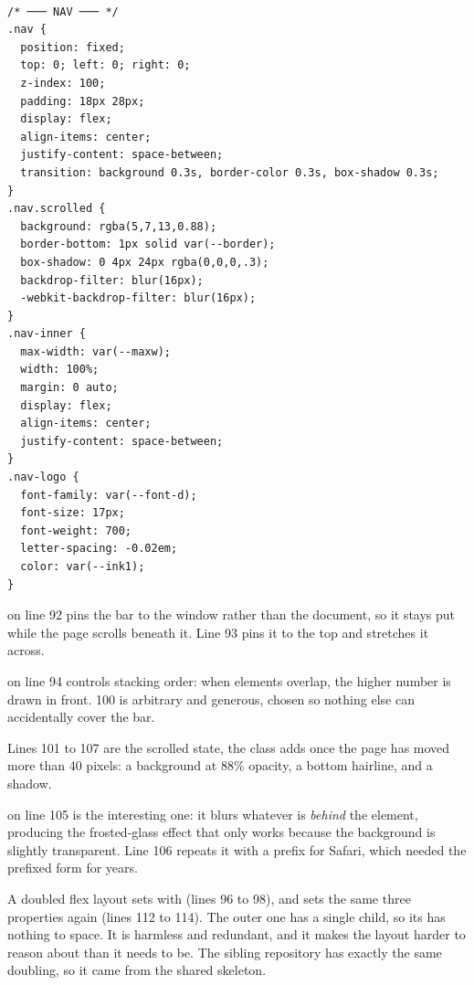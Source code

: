 \begin{lstlisting}[firstnumber=89,caption={\file{css/site.css}, lines 89--122}]

/* ─── NAV ─── */
.nav {
  position: fixed;
  top: 0; left: 0; right: 0;
  z-index: 100;
  padding: 18px 28px;
  display: flex;
  align-items: center;
  justify-content: space-between;
  transition: background 0.3s, border-color 0.3s, box-shadow 0.3s;
}
.nav.scrolled {
  background: rgba(5,7,13,0.88);
  border-bottom: 1px solid var(--border);
  box-shadow: 0 4px 24px rgba(0,0,0,.3);
  backdrop-filter: blur(16px);
  -webkit-backdrop-filter: blur(16px);
}
.nav-inner {
  max-width: var(--maxw);
  width: 100%;
  margin: 0 auto;
  display: flex;
  align-items: center;
  justify-content: space-between;
}
.nav-logo {
  font-family: var(--font-d);
  font-size: 17px;
  font-weight: 700;
  letter-spacing: -0.02em;
  color: var(--ink1);
}
\end{lstlisting}

 on line 92 pins the bar to the window rather than the
document, so it stays put while the page scrolls beneath it. Line 93 pins it to the
top and stretches it across.

 on line 94 controls stacking order: when elements overlap, the
higher number is drawn in front. 100 is arbitrary and generous, chosen so nothing
else can accidentally cover the bar.

Lines 101 to 107 are the scrolled state, the class  adds once the page
has moved more than 40 pixels: a background at 88\% opacity, a bottom hairline, and
a shadow.

 on line 105 is the interesting one: it blurs
whatever is \emph{behind} the element, producing the frosted-glass effect that only
works because the background is slightly transparent. Line 106 repeats it with a
 prefix for Safari, which needed the prefixed form for years.

\begin{honest}{A doubled flex layout}
 sets  with 
(lines 96 to 98), and  sets the same three properties again (lines
112 to 114). The outer one has a single child, so its  has
nothing to space. It is harmless and redundant, and it makes the layout harder to
reason about than it needs to be. The sibling repository has exactly the same
doubling, so it came from the shared skeleton.
\end{honest}

